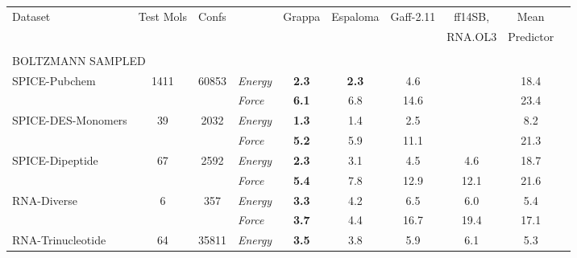 \documentclass[varwidth]{standalone}
\newcommand{\widthbetweentype}{7pt}
\begin{document}
\begin{adjustbox}{width=\textwidth,center}
\centering

\renewcommand{\arraystretch}{1.0} %


\begin{tabular}{l c c l c c c c c c}

\hline
\hline
\multirow{2}{*}{Dataset} & \multirow{2}{*}{Test Mols} & \multirow{2}{*}{Confs} & & \multirow{2}{*}{Grappa} & \multirow{2}{*}{Espaloma} & \multirow{2}{*}{Gaff-2.11} & ff14SB, & Mean\\
& & & & & & & RNA.OL3 & Predictor\\
\hline
\multicolumn{8}{l}{\vspace{\widthbetweentype}} \\[-1em]
\multicolumn{8}{l}{\small{BOLTZMANN SAMPLED}} \\\hline
\multirow{2}{*}{SPICE-Pubchem} & \multirow{2}{*}{1411} & \multirow{2}{*}{60853} & \textit{Energy} & \textbf{2.3} & \textbf{2.3} & 4.6 &  & 18.4\\
                                   &                       &                         & \textit{Force}  & \textbf{6.1} & 6.8 & 14.6 &  & 23.4\\
\hline
\multirow{2}{*}{SPICE-DES-Monomers} & \multirow{2}{*}{39} & \multirow{2}{*}{2032} & \textit{Energy} & \textbf{1.3} & 1.4 & 2.5 &  & 8.2\\
                                   &                       &                         & \textit{Force}  & \textbf{5.2} & 5.9 & 11.1 &  & 21.3\\
\hline
\multirow{2}{*}{SPICE-Dipeptide} & \multirow{2}{*}{67} & \multirow{2}{*}{2592} & \textit{Energy} & \textbf{2.3} & 3.1 & 4.5 & 4.6 & 18.7\\
                                   &                       &                         & \textit{Force}  & \textbf{5.4} & 7.8 & 12.9 & 12.1 & 21.6\\
\hline
\multirow{2}{*}{RNA-Diverse} & \multirow{2}{*}{6} & \multirow{2}{*}{357} & \textit{Energy} & \textbf{3.3} & 4.2 & 6.5 & 6.0 & 5.4\\
                                   &                       &                         & \textit{Force}  & \textbf{3.7} & 4.4 & 16.7 & 19.4 & 17.1\\
\hline
\multirow{2}{*}{RNA-Trinucleotide} & \multirow{2}{*}{64} & \multirow{2}{*}{35811} & \textit{Energy} & \textbf{3.5} & 3.8 & 5.9 & 6.1 & 5.3\\

\end{tabular}
\end{adjustbox}
\end{document}
